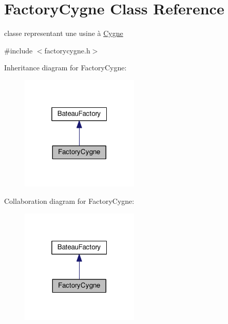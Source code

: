 \hypertarget{classFactoryCygne}{\section{Factory\+Cygne Class Reference}
\label{classFactoryCygne}
}


classe representant une usine à \hyperlink{classCygne}{Cygne}  




{\ttfamily \#include $<$factorycygne.\+h$>$}



Inheritance diagram for Factory\+Cygne\+:
\nopagebreak
\begin{figure}[H]
\begin{center}
\leavevmode
\includegraphics[width=160pt]{classFactoryCygne__inherit__graph}
\end{center}
\end{figure}


Collaboration diagram for Factory\+Cygne\+:
\nopagebreak
\begin{figure}[H]
\begin{center}
\leavevmode
\includegraphics[width=160pt]{classFactoryCygne__coll__graph}
\end{center}
\end{figure}
